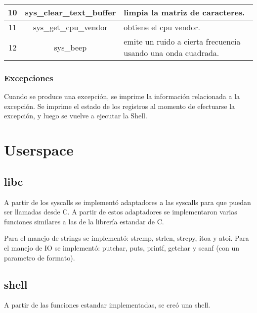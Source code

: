 \documentclass{article}
\begin{document}
\begin{center}
\begin{tabular}{|c|c|l|}
10 & sys\_clear\_text\_buffer &  \begin{minipage}{80mm}limpia la matriz de caracteres.\end{minipage} \\ \hline
11 & sys\_get\_cpu\_vendor &  \begin{minipage}{80mm}obtiene el cpu vendor. \end{minipage} \\ \hline
12 & sys\_beep &  \begin{minipage}{80mm}emite un ruido a cierta frecuencia usando una onda cuadrada.\end{minipage} \\ \hline
\end{tabular}
\label{table:syscalls}
\end{center}

\subsubsection {Excepciones}

Cuando se produce una excepción, se imprime la información relacionada a la excepción. Se imprime el estado de los registros al momento de efectuarse la excepción, y luego se vuelve a ejecutar la Shell.

\section {Userspace}

\subsection {libc}

A partir de los syscalls se implementó adaptadores a las syscalls para que puedan ser llamadas desde C. A partir de estos adaptadores se implementaron varias funciones similares a las de la librería estandar de C.

Para el manejo de strings se implementó: strcmp, strlen, strcpy, itoa y atoi.
Para el manejo de IO se implementó: putchar, puts, printf, getchar y scanf (con un parametro de formato).

\subsection {shell}

A partir de las funciones estandar implementadas, se creó una shell. 
\end{document}
